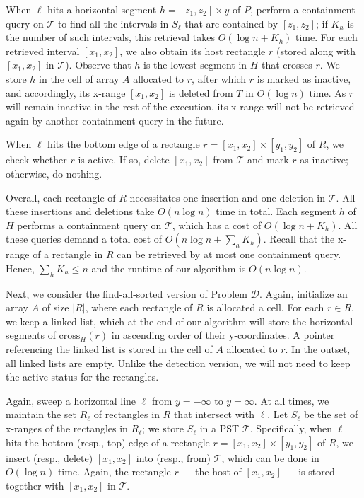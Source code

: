 \documentclass[sigconf]{acmart}
\def\vgap{\vspace{0mm}}
\def\T{\mathcal{T}}
\def\cross{\mathrm{cross}}
\begin{document}
{{{\vgap

When $\ell$ hits a horizontal segment $h = [z_1, z_2] \times y$ of $P$, perform a containment query on $\T$ to find all the intervals in $S_\ell$ that are contained by $[z_1, z_2]$; if $K_h$ is the number of such intervals, this retrieval takes $O(\log n + K_h)$ time. For each retrieved interval $[x_1, x_2]$, we also obtain its host rectangle $r$ (stored along with $[x_1, x_2]$ in $\T$). Observe that $h$ is the lowest segment in $H$ that crosses $r$. We store $h$ in the cell of array $A$ allocated to $r$, after which $r$ is marked as inactive, and accordingly, its x-range $[x_1, x_2]$ is deleted from $T$ in $O(\log n)$ time. As $r$ will remain inactive in the rest of the execution, its x-range will not be retrieved again by another containment query in the future.

\vgap

When $\ell$ hits the bottom edge of a rectangle $r = [x_1, x_2] \times [y_1, y_2]$ of $R$, we check whether $r$ is active. If so, delete $[x_1, x_2]$ from $\T$ and mark $r$ as inactive; otherwise, do nothing.

\vgap

Overall, each rectangle of $R$ necessitates one insertion and one deletion in $\T$. All these insertions and deletions take $O(n \log n)$ time in total. Each segment $h$ of $H$ performs a containment query on $\T$, which has a cost of $O(\log n + K_h)$. All these queries demand a total cost of $O(n \log n + \sum_h K_h)$. Recall that the x-range of a rectangle in $R$ can be retrieved by at most one containment query. Hence, $\sum_h K_h \le n$ and the runtime of our algorithm is $O(n \log n)$.

\vgap

Next, we consider the find-all-sorted version of Problem $\mathscr{D}$. Again, initialize an array $A$ of size $|R|$, where each rectangle of $R$ is allocated a cell. For each $r \in R$, we keep a linked list, which at the end of our algorithm will store the horizontal segments of $\cross_H(r)$ in ascending order of their y-coordinates. A pointer referencing the linked list is stored in the cell of $A$ allocated to $r$. In the outset, all linked lists are empty. Unlike the detection version, we will not need to keep the active status for the rectangles.

\vgap

Again, sweep a horizontal line $\ell$ from $y = -\infty$ to $y = \infty$. At all times, we maintain the set $R_\ell$ of rectangles in $R$ that intersect with $\ell$. Let $S_\ell$ be the set of x-ranges of the rectangles in $R_\ell$; we store $S_\ell$ in a PST $\T$. Specifically, when $\ell$ hits the bottom (resp., top) edge of a rectangle $r = [x_1, x_2] \times [y_1, y_2]$ of $R$, we insert (resp., delete) $[x_1, x_2]$ into (resp., from) $\T$, which can be done in $O(\log n)$ time. Again, the rectangle $r$ --- the host of $[x_1, x_2]$ --- is stored together with $[x_1, x_2]$ in $\T$.

}}}
\end{document}
